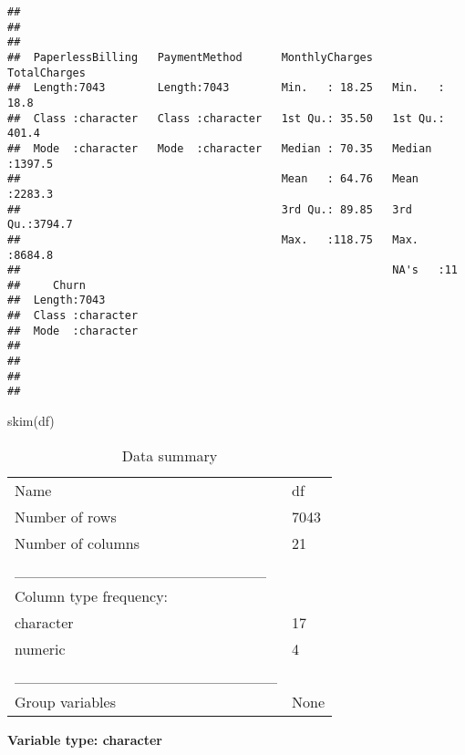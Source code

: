 \documentclass[
]{article}
\newenvironment{Shaded}{\begin{snugshade}}{\end{snugshade}}
\newcommand{\FunctionTok}[1]{\textcolor[rgb]{0.00,0.00,0.00}{#1}}
\newcommand{\NormalTok}[1]{#1}
\begin{document}
\begin{verbatim}
##                                                                             
##                                                                             
##                                                                             
##  PaperlessBilling   PaymentMethod      MonthlyCharges    TotalCharges   
##  Length:7043        Length:7043        Min.   : 18.25   Min.   :  18.8  
##  Class :character   Class :character   1st Qu.: 35.50   1st Qu.: 401.4  
##  Mode  :character   Mode  :character   Median : 70.35   Median :1397.5  
##                                        Mean   : 64.76   Mean   :2283.3  
##                                        3rd Qu.: 89.85   3rd Qu.:3794.7  
##                                        Max.   :118.75   Max.   :8684.8  
##                                                         NA's   :11      
##     Churn          
##  Length:7043       
##  Class :character  
##  Mode  :character  
##                    
##                    
##                    
## 
\end{verbatim}

\begin{Shaded}
\begin{Highlighting}[]
\FunctionTok{skim}\NormalTok{(df)}
\end{Highlighting}
\end{Shaded}

\begin{longtable}[]{@{}ll@{}}
\caption{Data summary}\tabularnewline
\toprule()
\endhead
Name & df \\
Number of rows & 7043 \\
Number of columns & 21 \\
\_\_\_\_\_\_\_\_\_\_\_\_\_\_\_\_\_\_\_\_\_\_\_ & \\
Column type frequency: & \\
character & 17 \\
numeric & 4 \\
\_\_\_\_\_\_\_\_\_\_\_\_\_\_\_\_\_\_\_\_\_\_\_\_ & \\
Group variables & None \\
\bottomrule()
\end{longtable}

\textbf{Variable type: character}
\end{document}
